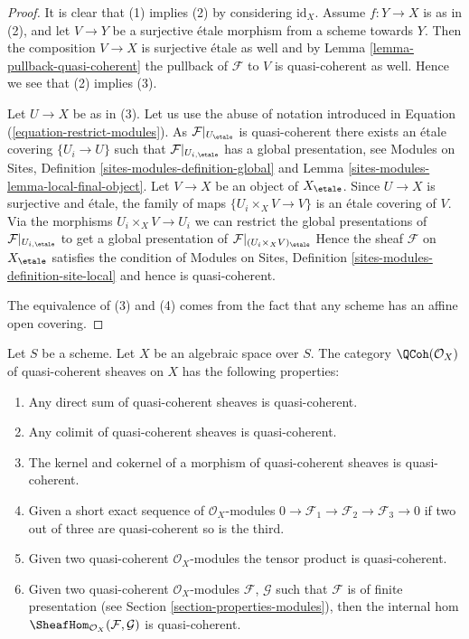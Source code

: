 \begin{proof}
It is clear that (1) implies (2) by considering $\text{id}_X$.
Assume $f : Y \to X$ is as in (2), and let $V \to Y$ be a surjective
\'etale morphism from a scheme towards $Y$. Then the composition $V \to X$ is
surjective \'etale as well
and by Lemma \ref{lemma-pullback-quasi-coherent} the pullback of $\mathcal{F}$
to $V$ is quasi-coherent as well. Hence we see that (2) implies (3).

\medskip\noindent
Let $U \to X$ be as in (3). Let us use the abuse of notation introduced
in Equation (\ref{equation-restrict-modules}).
As $\mathcal{F}|_{U_\etale}$ is quasi-coherent there exists an
\'etale covering $\{U_i \to U\}$ such that
$\mathcal{F}|_{U_{i, \etale}}$ has a global presentation, see
Modules on Sites, Definition \ref{sites-modules-definition-global} and
Lemma \ref{sites-modules-lemma-local-final-object}.
Let $V \to X$ be an object of $X_\etale$. Since $U \to X$ is
surjective and \'etale, the family of maps $\{U_i \times_X V \to V\}$ is an
\'etale covering
of $V$. Via the morphisms $U_i \times_X V \to U_i$ we can restrict the
global presentations of $\mathcal{F}|_{U_{i, \etale}}$ to get a global
presentation of $\mathcal{F}|_{(U_i \times_X V)_\etale}$
Hence the sheaf $\mathcal{F}$ on $X_\etale$ satisfies the condition of
Modules on Sites, Definition \ref{sites-modules-definition-site-local}
and hence is quasi-coherent.

\medskip\noindent
The equivalence of (3) and (4) comes from the fact that any scheme has
an affine open covering.
\end{proof}

\begin{lemma}
\label{lemma-properties-quasi-coherent}
Let $S$ be a scheme. Let $X$ be an algebraic space over $S$.
The category $\QCoh(\mathcal{O}_X)$ of quasi-coherent sheaves on $X$
has the following properties:
\begin{enumerate}
\item Any direct sum of quasi-coherent sheaves is quasi-coherent.
\item Any colimit of quasi-coherent sheaves is quasi-coherent.
\item The kernel and cokernel of a morphism of quasi-coherent sheaves
is quasi-coherent.
\item Given a short exact sequence of $\mathcal{O}_X$-modules
$0 \to \mathcal{F}_1 \to \mathcal{F}_2 \to \mathcal{F}_3 \to 0$
if two out of three are quasi-coherent so is the third.
\item Given two quasi-coherent $\mathcal{O}_X$-modules
the tensor product is quasi-coherent.
\item Given two quasi-coherent $\mathcal{O}_X$-modules
$\mathcal{F}$, $\mathcal{G}$ such that $\mathcal{F}$
is of finite presentation (see
Section \ref{section-properties-modules}),
then the internal hom
$\SheafHom_{\mathcal{O}_X}(\mathcal{F}, \mathcal{G})$
is quasi-coherent.
\end{enumerate}
\end{lemma}

